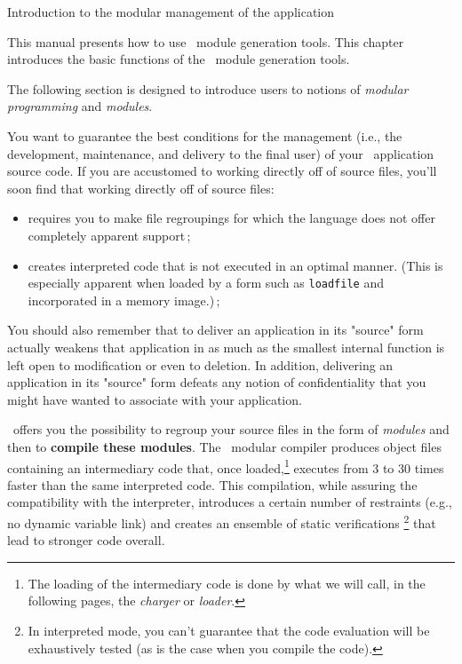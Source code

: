  {Introduction to the modular management of the application}


This manual presents how to use \LeLisp\  module generation tools.
This chapter introduces the basic functions of the \LeLisp\ module
generation tools.

The following section is designed to introduce users to notions of 
{\em modular programming} and {\em modules}.




You want to guarantee the best conditions for the management
(i.e., the development, maintenance, and delivery to the final user)
of your \LeLisp\ application source code.  If you are accustomed to working
directly off of source files, you'll soon find that working directly off of source files:

\begin{itemize}
\item requires you to make file regroupings for which the language does not offer completely apparent support\,;
\item creates interpreted code that is not executed in an optimal manner.  (This is especially apparent when loaded by a form such as {\tt loadfile} and incorporated in a memory image.)\,;
\end{itemize}

You should also remember that to deliver an application in its "source" form actually weakens that application in as much as the smallest internal function is left open to modification or even to deletion.  In addition, delivering an application in its "source" form defeats any notion of confidentiality that you might have wanted to associate with your application.


\LeLisp\ offers you the possibility to regroup your source files in the form of {\em modules} and then to {\bf compile these modules}.
The \LeLisp\ modular compiler produces object files containing an intermediary code that, once loaded,\footnote{The loading of the intermediary code is done by what we will call, in the following pages, the {\em charger} or {\em loader}.}
executes from 3 to 30 times faster than the same interpreted code.  This compilation, while assuring the compatibility with the interpreter, introduces a certain number of restraints (e.g., no dynamic variable link) and creates an ensemble of static verifications \footnote{In interpreted mode, you can't guarantee that the code evaluation will be exhaustively tested (as is the case when you compile the code).} that lead to stronger code overall.   


